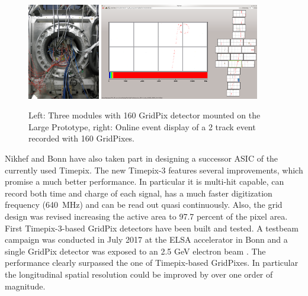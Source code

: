 \begin{figure}[!t]
  \centering
  \includegraphics[width=0.28\textwidth]{Tracker/TPC_Bonn/plots/TPC_pixels_LP_GridPixes.png}
  \includegraphics[width=0.62\textwidth]{Tracker/TPC_Bonn/plots/TPC_pixels_event.png}
  \caption{Left: Three modules with 160 GridPix detector mounted on the Large
    Prototype, right: Online event display of a 2 track event recorded with
    160 GridPixes.}
  \label{fig_TPC_pixels_2}
\end{figure}

Nikhef and Bonn have also taken part in designing a successor ASIC of
the currently used Timepix. The new Timepix-3 features several improvements,
which promise a much better performance. In particular it is multi-hit capable,
can record both time and charge of each signal, has a much faster
digitization frequency (\SI{640}{\mega\hertz}) and can be read out  quasi continuously.
Also, the grid design was revised increasing the active area to 97.7 percent of the pixel area. First Timepix-3-based GridPix detectors have been built and tested. A testbeam campaign was conducted in July 2017 at the ELSA accelerator in Bonn and a single GridPix detector was exposed to an 2.5 GeV electron beam \cite{Ligtenberg:2018sjs}. The performance clearly surpassed the one of Timepix-based GridPixes. In particular the longitudinal spatial resolution could be improved by over one order of magnitude. 

